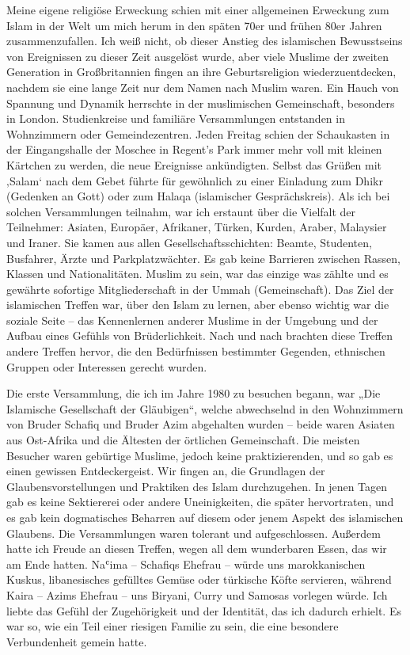 \documentclass[12pt]{memoir}
\def\`{ʿ} %
\begin{document}
Meine eigene religiöse Erweckung schien
mit einer allgemeinen Erweckung zum Islam in der Welt um mich herum
in den späten 70er und frühen 80er Jahren zusammenzufallen.
Ich weiß nicht, ob dieser Anstieg des islamischen Bewusstseins
von Ereignissen zu dieser Zeit ausgelöst wurde,
aber viele Muslime der zweiten Generation in Großbritannien fingen an
ihre Geburtsreligion wiederzuentdecken,
nachdem sie eine lange Zeit nur dem Namen nach Muslim waren.
Ein Hauch von Spannung und Dynamik herrschte
in der muslimischen Gemeinschaft, besonders in London.
Studienkreise und familiäre Versammlungen entstanden
in Wohnzimmern oder Gemeindezentren.
Jeden Freitag schien der Schaukasten in der Eingangshalle
der Moschee in Regent’s Park immer mehr voll mit kleinen Kärtchen zu werden,
die neue Ereignisse ankündigten.
Selbst das Grüßen mit ‚Salam‘ nach dem Gebet führte für gewöhnlich
zu einer Einladung zum Dhikr (Gedenken an Gott)
oder zum Halaqa (islamischer Gesprächskreis).
Als ich bei solchen Versammlungen teilnahm,
war ich erstaunt über die Vielfalt der Teilnehmer:
Asiaten, Europäer, Afrikaner, Türken, Kurden, Araber, Malaysier und Iraner.
Sie kamen aus allen Gesellschaftsschichten:
Beamte, Studenten, Busfahrer, Ärzte und Parkplatzwächter.
Es gab keine Barrieren zwischen Rassen, Klassen und Nationalitäten.
Muslim zu sein, war das einzige was zählte und es gewährte
sofortige Mitgliederschaft in der Ummah (Gemeinschaft).
Das Ziel der islamischen Treffen war, über den Islam zu lernen,
aber ebenso wichtig war die soziale Seite –
das Kennenlernen anderer Muslime in der Umgebung
und der Aufbau eines Gefühls von Brüderlichkeit.
Nach und nach brachten diese Treffen andere Treffen hervor,
die den Bedürfnissen bestimmter Gegenden,
ethnischen Gruppen oder Interessen gerecht wurden.

Die erste Versammlung, die ich im Jahre 1980 zu besuchen begann,
war „Die Islamische Gesellschaft der Gläubigen“,
welche abwechselnd in den Wohnzimmern von Bruder Schafiq und Bruder Azim
abgehalten wurden – beide waren Asiaten aus Ost-Afrika
und die Ältesten der örtlichen Gemeinschaft.
Die meisten Besucher waren gebürtige Muslime, jedoch keine praktizierenden,
und so gab es einen gewissen Entdeckergeist.
Wir fingen an, die Grundlagen der Glaubensvorstellungen
und Praktiken des Islam durchzugehen.
In jenen Tagen gab es keine Sektiererei oder andere Uneinigkeiten,
die später hervortraten, und es gab kein dogmatisches Beharren
auf diesem oder jenem Aspekt des islamischen Glaubens.
Die Versammlungen waren tolerant und aufgeschlossen.
Außerdem hatte ich Freude an diesen Treffen, wegen all dem wunderbaren Essen,
das wir am Ende hatten. Na\`ima – Schafiqs Ehefrau –
würde uns marokkanischen Kuskus, libanesisches gefülltes Gemüse
oder türkische Köfte servieren, während Kaira – Azims Ehefrau –
uns Biryani, Curry und Samosas vorlegen würde.
Ich liebte das Gefühl der Zugehörigkeit und der Identität,
das ich dadurch erhielt.
Es war so, wie ein Teil einer riesigen Familie zu sein,
die eine besondere Verbundenheit gemein hatte.
\end{document}
